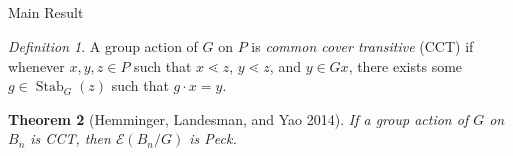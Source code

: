 \documentclass{beamer}
\newtheorem{thm}{Theorem}
\newtheorem{lem}[thm]{Lemma}
\newtheorem{prop}[thm]{Proposition}
\theoremstyle{remark}
\newtheorem{defn}[thm]{Definition}
\def\Stab{\operatorname{Stab}}
\begin{document}

\subsection{}

\begin{frame}{Main Result}
\begin{defn}
A group action of $G$ on $P$ is \textit{common cover transitive} (CCT) if whenever $x,y,z\in P$ such that $x\lessdot z$, $y\lessdot z$, and $y\in Gx$, there exists some $g\in \Stab_G(z)$ such that $g\cdot x = y$.
\end{defn}

\begin{thm}[Hemminger, Landesman, and Yao 2014]
If a group action of $G$ on $B_n$ is CCT, then $\mathcal{E}(B_n/G)$ is Peck.
\end{thm}
\end{frame}


















\end{document}

